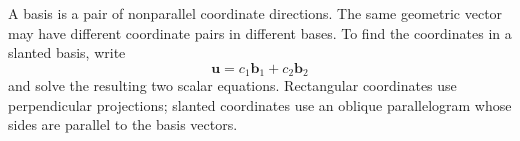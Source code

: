 \begin{summarybox}
A basis is a pair of nonparallel coordinate directions. The same geometric
vector may have different coordinate pairs in different bases. To find the
coordinates in a slanted basis, write
\[
\mathbf u=c_1\mathbf b_1+c_2\mathbf b_2
\]
and solve the resulting two scalar equations. Rectangular coordinates use
perpendicular projections; slanted coordinates use an oblique parallelogram
whose sides are parallel to the basis vectors.
\end{summarybox}
